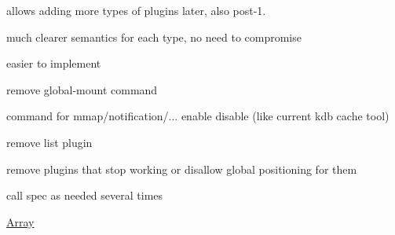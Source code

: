 \begin{DoxyItemize}
\item allows adding more types of plugins later, also post-\/1.
\item much clearer semantics for each type, no need to compromise
\item easier to implement
\end{DoxyItemize}


\begin{DoxyItemize}
\item remove {\ttfamily global-\/mount} command
\item command for mmap/notification/... enable disable (like current {\ttfamily kdb cache} tool)
\item remove {\ttfamily list} plugin
\item remove plugins that stop working or disallow global positioning for them
\item call {\ttfamily spec} as needed several times
\end{DoxyItemize}


\begin{DoxyItemize}
\item \hyperlink{doc_decisions_array_md}{Array}
\end{DoxyItemize}